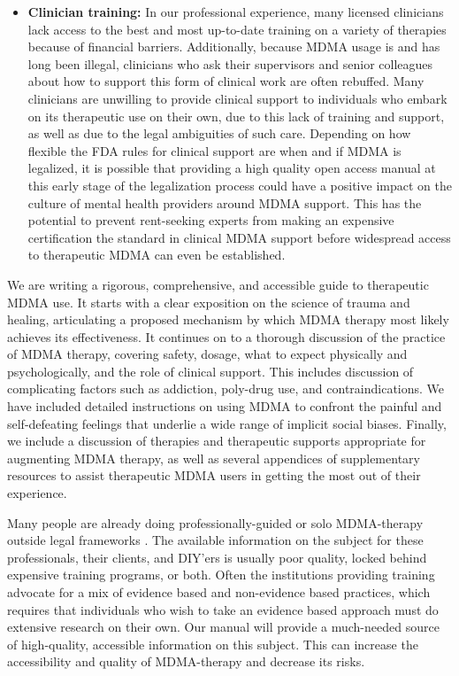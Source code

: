 \documentclass[12pt,letterpaper]{book}
\begin{document}
\begin{itemize}
    \item \textbf{Clinician training:} In our professional experience, many licensed clinicians lack access to the best and most up-to-date training on a variety of therapies because of financial barriers. Additionally, because MDMA usage is and has long been illegal, clinicians who ask their supervisors and senior colleagues about how to support this form of clinical work are often rebuffed. Many clinicians are unwilling to provide clinical support to individuals who embark on its therapeutic use on their own, due to this lack of training and support, as well as due to the legal ambiguities of such care. Depending on how flexible the FDA rules for clinical support are when and if MDMA is legalized, it is possible that providing a high quality open access manual at this early stage of the legalization process could have a positive impact on the culture of mental health providers around MDMA support. This has the potential to prevent rent-seeking experts from making an expensive certification the standard in clinical MDMA support before widespread access to therapeutic MDMA can even be established.
\end{itemize}

We are writing a rigorous, comprehensive, and accessible guide to therapeutic MDMA use. It starts with a clear exposition on the science of trauma and healing, articulating a proposed mechanism by which MDMA therapy most likely achieves its effectiveness. It continues on to a thorough discussion of the practice of MDMA therapy, covering safety, dosage, what to expect physically and psychologically, and the role of clinical support. This includes discussion of complicating factors such as addiction, poly-drug use, and contraindications. We have included detailed instructions on using MDMA to confront the painful and self-defeating feelings that underlie a wide range of implicit social biases. Finally, we include a discussion of therapies and therapeutic supports appropriate for augmenting MDMA therapy, as well as several appendices of supplementary resources to assist therapeutic MDMA users in getting the most out of their experience.

Many people are already doing professionally-guided or solo MDMA-therapy outside legal frameworks \cite{hillsSolo,passieHistory}. The available information on the subject for these professionals, their clients, and DIY'ers is usually poor quality, locked behind expensive training programs, or both. Often the institutions providing training advocate for a mix of evidence based and non-evidence based practices, which requires that individuals who wish to take an evidence based approach must do extensive research on their own. Our manual will provide a much-needed source of high-quality, accessible information on this subject. This can increase the accessibility and quality of MDMA-therapy and decrease its risks.
\end{document}
